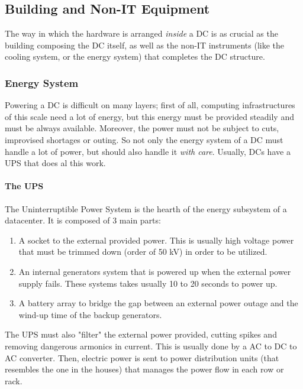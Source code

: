 \documentclass[10pt,a4paper]{article}
\begin{document}
			\subsection{Building and Non-IT Equipment}
				The way in which the hardware is arranged \emph{inside} a DC is as crucial as the building composing the DC itself, as well as the non-IT instruments (like the cooling system, or the energy system) that completes the DC structure.\\
				
				\subsubsection{Energy System}
					Powering a DC is difficult on many layers; first of all, computing infrastructures of this scale need a lot of energy, but this energy must be provided steadily and must be always available. Moreover, the power must not be subject to cuts, improvised shortages or outing. So not only the energy system of a DC must handle a lot of power, but should also handle it \emph{with care}. Usually, DCs have a UPS that does al this work.
					
					\paragraph{The UPS}
						The Uninterruptible Power System is the hearth of the energy subsystem of a datacenter. It is composed of 3 main parts:
						\begin{enumerate}
							\item A socket to the external provided power. This is usually high voltage power that must be trimmed down (order of 50 kV) in order to be utilized.
							\item An internal generators system that is powered up when the external power supply fails. These systems takes usually 10 to 20 seconds to power up.
							\item A battery array to bridge the gap between an external power outage and the wind-up time of the backup generators.
						\end{enumerate}
						The UPS must also "filter" the external power provided, cutting spikes and removing dangerous armonics in current. This is usually done by a AC to DC to AC converter. Then, electric power is sent to power distribution units (that resembles the one in the houses) that manages the power flow in each row or rack.
				
\end{document}
